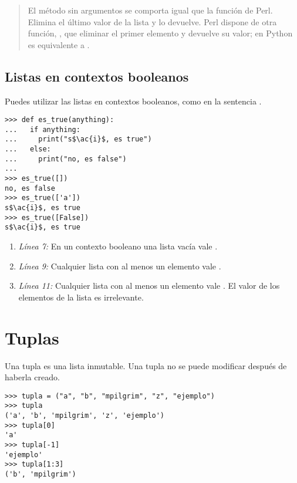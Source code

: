 \begin{quote}
El método  sin argumentos se comporta igual que la función  de Perl. Elimina el último valor de la lista y lo devuelve. Perl dispone de otra función, , que eliminar el primer elemento y devuelve su valor; en Python es equivalente a .
\end{quote}

\subsection{Listas en contextos booleanos}


Puedes utilizar las listas en contextos booleanos, como en la sentencia .

\noindent\begin{minipage}{\textwidth}
\begin{lstlisting}[mathescape=True]
>>> def es_true(anything):
...   if anything:
...     print("s$\ac{i}$, es true")
...   else:
...     print("no, es false")
...
>>> es_true([])
no, es false
>>> es_true(['a'])
s$\ac{i}$, es true
>>> es_true([False])
s$\ac{i}$, es true
\end{lstlisting}
\end{minipage}

\begin{enumerate}

\item \emph{Línea 7:} En un contexto booleano una lista vacía vale .

\item \emph{Línea 9:} Cualquier lista con al menos un elemento vale .

\item \emph{Línea 11:} Cualquier lista con al menos un elemento vale . El valor de los elementos de la lista es irrelevante.

\end{enumerate}

\section{Tuplas}

Una tupla es una lista inmutable. Una tupla no se puede modificar después de haberla creado.

\noindent\begin{minipage}{\textwidth}
\begin{lstlisting}[mathescape=True]
>>> tupla = ("a", "b", "mpilgrim", "z", "ejemplo")
>>> tupla
('a', 'b', 'mpilgrim', 'z', 'ejemplo')
>>> tupla[0]
'a'
>>> tupla[-1]
'ejemplo'
>>> tupla[1:3]
('b', 'mpilgrim')
\end{lstlisting}
\end{minipage}


